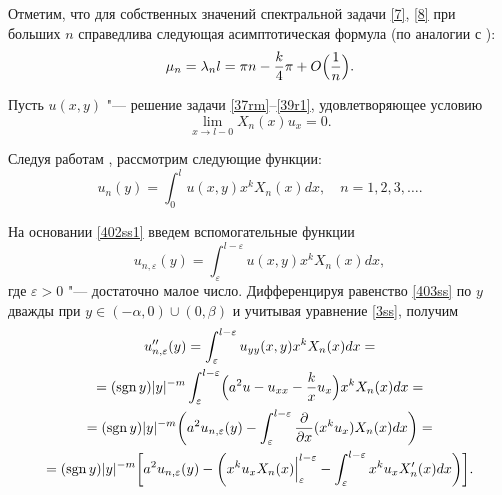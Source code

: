 Отметим, что для собственных значений спектральной задачи \eqref{7}, \eqref{8} при больших $n$ справедлива следующая асимптотическая формула (по аналогии с \cite[Sect.~6.5]{safina:Vgn1}):
\begin{equation}
\label{7as} \mu_{n}=\lambda_{n}l=\pi n-\frac{k}{4}\pi+O\Bigl(\frac{1}{n}\Bigr).
\end{equation}

Пусть $u(x,y)$ "--- решение задачи \eqref{37rm}--\eqref{39r1}, удовлетворяющее условию
\begin{equation}
\label{16kb}  
\lim\limits_{x\rightarrow l-0}X_{n}(x)u_{x}=0.
\end{equation}

Следуя работам \cite{safina:Skb1,safina:SafDu},  рассмотрим следующие функции:
\begin{equation}
\label{402ss1}
u_{n}(y)= \int _{0}^{l}u(x,y)x^{k}X_{n}(x)dx, \quad  n=1, 2, 3, \dots .
\end{equation}

На основании \eqref{402ss1} введем вспомогательные функции
\begin{equation}
\label{403ss}
u_{n,\varepsilon}(y)= \int _{\varepsilon}^{l-\varepsilon}u(x,y)x^{k}X_{n}(x)dx,
\end{equation}
где $\varepsilon>0$ "--- достаточно малое число. 
Дифференцируя равенство \eqref{403ss} по $y$ дважды при $y\in (-\alpha,0)\cup (0, \beta)$ и учитывая уравнение \eqref{3ss}, получим
\begin{multline} \label{404ss}
u_{n,\varepsilon}''(y)= 
\int _{\varepsilon}^{l-\varepsilon}u_{yy}(x,y)x^{k}X_{n}(x)dx=
\\
=(\mathop{\rm sgn}y)|y|^{-m} \int _{\varepsilon}^{l-\varepsilon} 
\Bigl(a^{2}u-u_{xx}-\frac{k}{x}u_{x}\Bigr)x^{k}X_{n}(x)dx=
\\
=(\mathop{\rm sgn}y)|y|^{-m}
\biggl(a^{2}u_{n,\varepsilon}(y)- \int _{\varepsilon}^{l-\varepsilon}\frac{\partial}{\partial
x}(x^{k}u_{x})X_{n}(x)dx\biggr)= 
\\
=(\mathop{\rm sgn}y)|y|^{-m}
\biggl[a^{2}u_{n,\varepsilon}(y)-\biggl(x^{k}u_{x}X_{n}(x)\Big|_{\varepsilon}^{l-\varepsilon}- \int _{\varepsilon}^{l-\varepsilon}x^{k}u_{x}X_{n}'(x)dx\biggr)
\biggr].
\end{multline}

